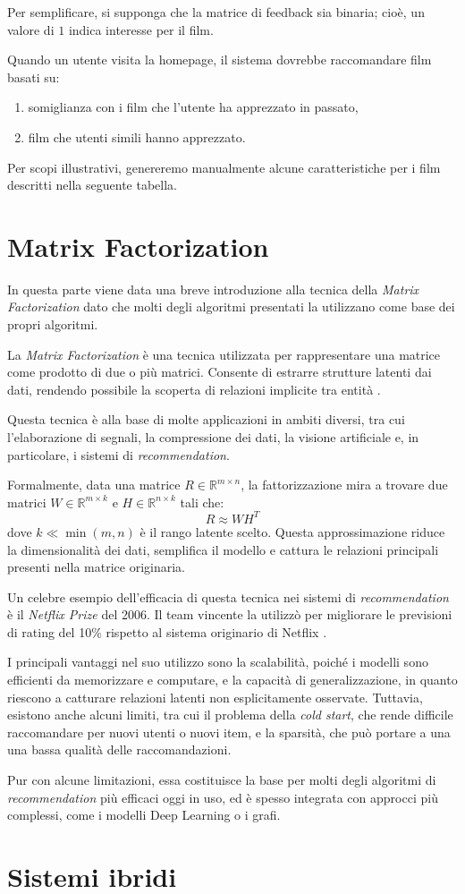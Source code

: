 Per semplificare, si supponga che la matrice di feedback sia binaria; cioè, un valore di $1$ indica interesse per il film.

Quando un utente visita la homepage, il sistema dovrebbe raccomandare film basati su:

\begin{enumerate}
    \item somiglianza con i film che l'utente ha apprezzato in passato,
    \item film che utenti simili hanno apprezzato.
\end{enumerate}

Per scopi illustrativi, genereremo manualmente alcune caratteristiche per i film descritti nella seguente tabella.
    

\section{Matrix Factorization}

In questa parte viene data una breve introduzione alla tecnica della \textit{Matrix Factorization} dato che molti degli algoritmi presentati la utilizzano come base dei propri algoritmi.

La \textit{Matrix Factorization} è una tecnica utilizzata per rappresentare una matrice come prodotto di due o più matrici. Consente di estrarre strutture latenti dai dati, rendendo possibile la scoperta di relazioni implicite tra entità \cite{MC}.

Questa tecnica è alla base di molte applicazioni in ambiti diversi, tra cui l'elaborazione di segnali, la compressione dei dati, la visione artificiale e, in particolare, i sistemi di \textit{recommendation}.

Formalmente, data una matrice $R \in \mathbb{R}^{m \times n}$, la fattorizzazione mira a trovare due matrici $W \in \mathbb{R}^{m \times k}$ e $H \in \mathbb{R}^{n \times k}$ tali che:
\[
R \approx WH^T
\]
dove $k \ll \min(m,n)$ è il rango latente scelto. Questa approssimazione riduce la dimensionalità dei dati, semplifica il modello e cattura le relazioni principali presenti nella matrice originaria.

Un celebre esempio dell'efficacia di questa tecnica nei sistemi di \textit{recommendation} è il \textit{Netflix Prize} del 2006. Il team vincente la utilizzò per migliorare le previsioni di rating del 10\% rispetto al sistema originario di Netflix \cite{TheNP}.

I principali vantaggi nel suo utilizzo sono la scalabilità, poiché i modelli sono efficienti da memorizzare e computare, e la capacità di generalizzazione, in quanto riescono a catturare relazioni latenti non esplicitamente osservate. Tuttavia, esistono anche alcuni limiti, tra cui il problema della \textit{cold start}, che rende difficile raccomandare per nuovi utenti o nuovi item, e la sparsità, che può portare a una una bassa qualità delle raccomandazioni\cite{SVD_analysis}.

Pur con alcune limitazioni, essa costituisce la base per molti degli algoritmi di \textit{recommendation} più efficaci oggi in uso, ed è spesso integrata con approcci più complessi, come i modelli Deep Learning o i grafi.


\section{Sistemi ibridi}